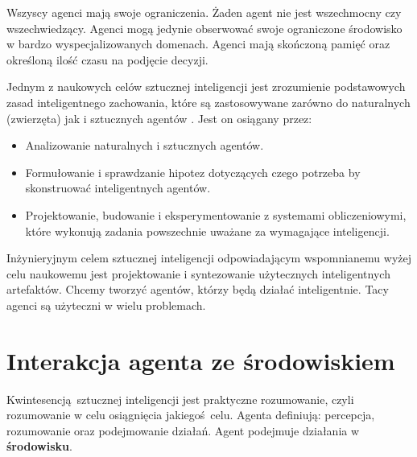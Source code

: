 \documentclass[a4paper, 12pt,twoside]{report}
\begin{document}
Wszyscy agenci mają swoje ograniczenia. Żaden agent nie jest wszechmocny czy 
wszechwiedzący. Agenci mogą jedynie obserwować swoje ograniczone środowisko
w bardzo wyspecjalizowanych domenach. Agenci mają skończoną pamięć oraz
określoną ilość czasu na podjęcie decyzji.

Jednym z naukowych celów sztucznej inteligencji jest zrozumienie podstawowych
zasad inteligentnego zachowania, które są zastosowywane zarówno do
naturalnych (zwierzęta) jak i sztucznych
agentów \cite{ai_foundations_scientific_goal}.
Jest on osiągany przez:
\begin{itemize}
	\setlength\itemsep{-0.4em}
	\item Analizowanie naturalnych i sztucznych agentów.
	\item Formułowanie i sprawdzanie hipotez dotyczących czego potrzeba
		by skonstruować inteligentnych agentów.
	\item Projektowanie, budowanie  i eksperymentowanie z systemami
		obliczeniowymi, które wykonują zadania powszechnie uważane
		za wymagające inteligencji.
\end{itemize}
Inżynieryjnym celem sztucznej inteligencji odpowiadającym wspomnianemu wyżej
celu naukowemu jest projektowanie i syntezowanie
użytecznych inteligentnych artefaktów. Chcemy tworzyć agentów, którzy będą
działać inteligentnie. Tacy agenci są użyteczni w wielu problemach.

\section{Interakcja agenta  ze środowiskiem}
Kwintesencją sztucznej inteligencji jest praktyczne rozumowanie, czyli
rozumowanie w celu osiągnięcia jakiegoś celu. Agenta definiują:
percepcja, rozumowanie oraz podejmowanie działań. Agent podejmuje działania w
\textbf{środowisku}.
\end{document}
